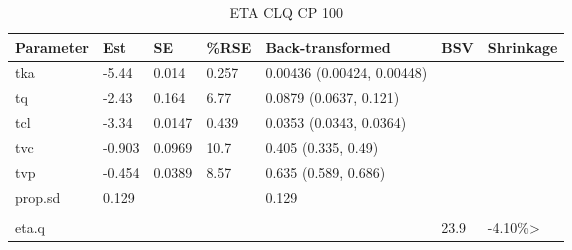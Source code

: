 \begin{table}
\centering\centering
\caption{ETA CLQ CP 100}
\centering
\fontsize{8}{10}\selectfont
\begin{tabular}[t]{lllllll}
\toprule
\textbf{Parameter} & \textbf{Est} & \textbf{SE} & \textbf{\%RSE} & \textbf{Back-transformed} & \textbf{BSV} & \textbf{Shrinkage}\\
\midrule
tka & -5.44 & 0.014 & 0.257 & 0.00436 (0.00424, 0.00448) &  & \\
\midrule
tq & -2.43 & 0.164 & 6.77 & 0.0879 (0.0637, 0.121) &  & \\
\midrule
tcl & -3.34 & 0.0147 & 0.439 & 0.0353 (0.0343, 0.0364) &  & \\
\midrule
tvc & -0.903 & 0.0969 & 10.7 & 0.405 (0.335, 0.49) &  & \\
\midrule
tvp & -0.454 & 0.0389 & 8.57 & 0.635 (0.589, 0.686) &  & \\
\midrule
prop.sd & 0.129 &  &  & 0.129 &  & \\
\midrule\\
eta.q &  &  &  &  & 23.9 & -4.10\%>\\
\bottomrule
\end{tabular}
\end{table}